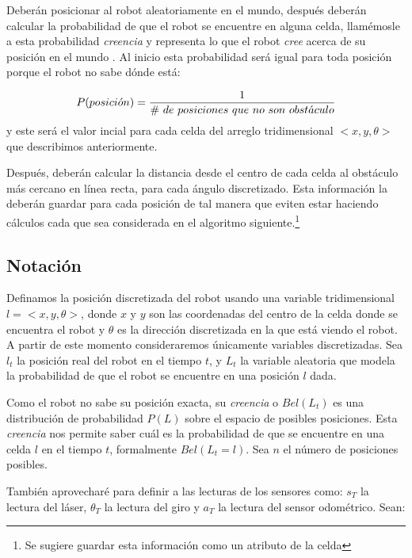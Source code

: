 Deberán posicionar al robot aleatoriamente en el mundo, después deberán calcular la probabilidad de que el robot se encuentre en alguna celda, llamémosle a esta probabilidad \textit{creencia} y representa lo que el robot \textit{cree} acerca de su posición en el mundo \parencite{Dieter1999}. Al inicio esta probabilidad será igual para toda posición porque el robot no sabe dónde está:

\[ P(posici\acute{o}n) = {1 \over \# \ de\ posiciones\ que\ no\ son\ obst\acute{a}culo}\]
y este será el valor incial para cada celda del arreglo tridimensional \(<x,y,\theta>\) que describimos anteriormente.
\medskip

Después, deberán calcular la distancia desde el centro de cada celda al obstáculo más cercano en línea recta, para cada ángulo discretizado. Esta información la deberán guardar para cada posición de tal manera que eviten estar haciendo cálculos cada que sea considerada en el algoritmo siguiente.\footnote{Se sugiere guardar esta información como un atributo de la celda}

\subsection{Notaci\'on}

Definamos la posición discretizada del robot usando una variable tridimensional $l = <x,y,\theta>$, donde $x$ y $y$ son las coordenadas del centro de la celda donde se encuentra el robot y $\theta$ es la dirección discretizada en la que está viendo el robot. A partir de este momento consideraremos únicamente variables discretizadas. Sea $l_t$ la posición real del robot en el tiempo $t$, y $L_t$ la variable aleatoria que modela la probabilidad de que el robot se encuentre en una posición $l$ dada.

Como el robot no sabe su posición exacta, su \textit{creencia} o $Bel(L_t)$ es una distribución de probabilidad \(P(L)\) sobre el espacio de posibles posiciones. Esta \textit{creencia} nos permite saber cuál es la probabilidad de que se encuentre en una celda $l$ en el tiempo $t$, formalmente $Bel(L_t = l)$. Sea \(n\) el número de posiciones posibles.


También aprovecharé para definir a las lecturas de los sensores como: $s_T$ la lectura del láser, $\theta_T$ la lectura del giro y $a_T$ la lectura del sensor odométrico. Sean:

